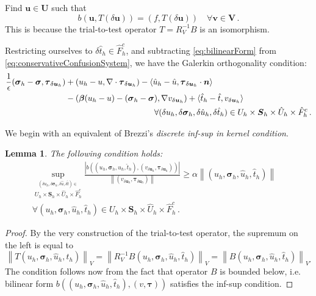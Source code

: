 \documentclass[letterpaper]{article}
\def\btau{\boldsymbol\tau}
\def\bsigma{\boldsymbol\sigma}
\def\bbeta{\boldsymbol\beta}
\newcommand{\bs}[1]{\boldsymbol{#1}}
\newcommand{\norm}[1]{\left\| #1 \right\|}
\newcommand{\snorm}[1]{\left| #1 \right|}
\newcommand{\vdeltau}{v_{\delta\bs u_h}}
\newcommand{\taudeltau}{\btau_{\delta\bs u_h}}
\newtheorem{lemma}{Lemma}
\begin{document}
Find $\bs u\in\bs U$ such that
\begin{equation}
b(\bs u,T(\delta\bs u))=(f,T(\delta\bs u))\quad\forall\bs v\in\bs V\,.
\label{eq:bilinearForm}
\end{equation}
This is because the trial-to-test operator $T=R_V^{-1}B$ is an isomorphism.

Restricting ourselves to $\delta\hat t_h\in\hat F_h^c$, and subtracting
\eqref{eq:bilinearForm} from \eqref{eq:conservativeConfusionSystem}, we have
the Galerkin orthogonality condition:
\begin{align}
\label{eq:galerkinOrthogonality}
\frac{1}{\epsilon}(\bsigma_h-\bsigma,\taudeltau)
&+(u_h-u,\nabla\cdot\taudeltau)
-\langle\hat u_h-\hat u,\taudeltau\cdot\bs n\rangle
\nonumber\\
&-(\bbeta(u_h-u)-(\bsigma_h-\bsigma),\nabla\vdeltau)
+\langle\hat t_h-\hat t,\vdeltau\rangle
\\
&\hspace{25ex}\forall(\delta u_h,\delta\bsigma_h,\delta\hat u_h,\delta\hat t_h)
\in U_h\times\bs S_h\times\hat U_h\times\hat F_h^c\,.
\nonumber
\end{align}

We begin with an equivalent of Brezzi's \emph{discrete inf-sup in kernel
condition}.
\begin{lemma}
\label{lemma:infsuplemma}
The following condition holds:
\begin{align}
\sup_{\stackrel{
(\delta u_h,\delta\bsigma_h,\delta\hat u,\delta\hat t)\in}
{U_h\times\bs S_h\times\hat U_h\times\hat F_h^c}
}
\frac{\snorm{
b((u_h,\bsigma_h,\hat u_h,\hat t_h), (\vdeltau,\taudeltau))
}}
{\norm{(\vdeltau,\taudeltau)}}
\ge\alpha\norm{(u_h,\bsigma_h,\hat u_h,\hat t_h)}\quad\nonumber\\
\forall(u_h,\bsigma_h,\hat u_h,\hat t_h)
\in U_h\times\bs S_h\times\hat U_h\times\hat F_h^c\,.
\label{eq:infsup}
\end{align}

\end{lemma}
\begin{proof}
By the very construction of the trial-to-test operator, the supremum on the
left is equal to
\begin{equation}
\norm{T(u_h,\bsigma_h,\hat u_h,\hat t_h)}_{V}
=\norm{R_V^{-1}B(u_h,\bsigma_h,\hat u_h, \hat t_h)}_{V}
=\norm{B(u_h,\bsigma_h,\hat u_h, \hat t_h)}_{V'}
\label{eq:infsupproof}
\end{equation}
The condition follows now from the fact that operator $B$ is bounded below,
i.e. bilinear form \linebreak$b((u_h,\bsigma_h,\hat u_h, \hat t_h),(v,\btau))$ satisfies
the inf-sup condition.
\end{proof}
\end{document}
